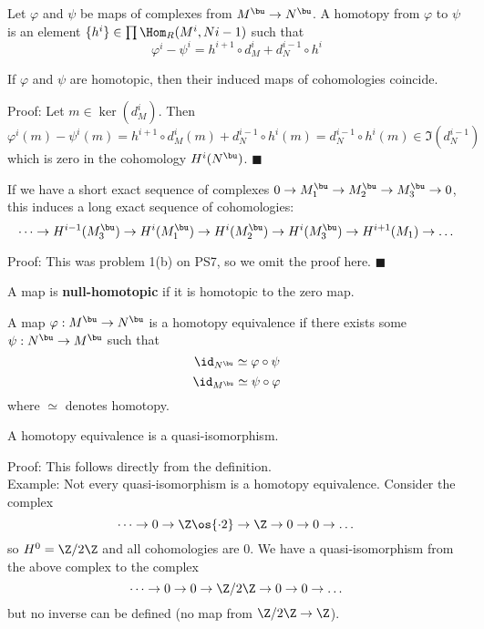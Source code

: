 \documentclass[10 pt]{article}
\newtheorem{cor}{Corollary}[section]
\newtheorem{lem}{Lemma}[section]
\newtheorem{prop}{Proposition}[section]
\newtheorem{propconstr}{Proposition-Construction}[section]
\newcommand\begin{lemma}{\begin{lem}}
\newcommand\begin{proposition}{\begin{prop}}
\newcommand\begin{proof}{\begin{proof}}
\newcommand\begin{corollary}{\begin{cor}}
\newcommand\begin{proposition}constr{\begin{propconstr}}
\newcommand\end{definition}{\end{defn}}
\newcommand\end{lemma}{\end{lem}}
\newcommand\end{corollary}{\end{cor}}
\newcommand\end{proposition}{\end{prop}}
\newcommand\end{proof}{\end{proof}}
\newcommand\end{proposition}constr{\end{propconstr}}
\begin{document}
\begin{definition} Let $\varphi$ and $\psi$ be maps of complexes from $M^\bu\rightarrow N^\bu$.  A homotopy from $\varphi$ to $\psi$ is an element $\{h^i\}\in \prod \Hom_R(M^i,N{i-1})$ such that
$$\varphi^i-\psi^i = h^{i+1}\circ d^i_M + d^{i-1}_N\circ h^i$$
\end{definition}

\begin{lemma} If $\varphi$ and $\psi$ are homotopic, then their induced maps of cohomologies coincide.\end{lemma}

Proof:  Let $m\in\ker(d^i_M)$.  Then
$$\varphi^i(m)-\psi^i(m)= h^{i+1}\circ d^i_M(m) + d^{i-1}_N\circ h^i(m)= d^{i-1}_N\circ h^i(m) \in \Im(d^{i-1}_N)$$
which is zero in the cohomology $H^i(N^\bu)$. $\blacksquare$

\begin{proposition} If we have a short exact sequence of complexes $0\rightarrow M_1^\bu\rightarrow M_2^\bu \rightarrow M_3^\bu\rightarrow 0$, this induces a long exact sequence of cohomologies:
$$\dots\rightarrow H^{i-1}(M_3^\bu)\rightarrow H^i(M_1^\bu)\rightarrow H^i(M_2^\bu)\rightarrow H^i(M_3^\bu) \rightarrow H^{i+1}(M_1)\rightarrow \dots$$
\end{proposition}

Proof:  This was problem 1(b) on PS7, so we omit the proof here. $\blacksquare$

\begin{definition} A map is {\bf null-homotopic} if it is homotopic to the zero map.\end{definition}

\begin{definition} A map $\varphi:M^\bu\rightarrow N^\bu$ is a homotopy equivalence if there exists some $\psi:N^\bu\rightarrow M^\bu$ such that
$$\id_{N^\bu}\simeq \varphi\circ \psi$$
$$\id_{M^\bu}\simeq \psi\circ \varphi$$
where $\simeq$ denotes homotopy.
\end{definition}

\begin{lemma} A homotopy equivalence is a quasi-isomorphism.\end{lemma}

Proof:  This follows directly from the definition.\\

Example:  Not every quasi-isomorphism is a homotopy equivalence.  Consider the complex
$$\dots \rightarrow 0\rightarrow\Z\os{\cdot 2}\rightarrow \Z\rightarrow 0\rightarrow 0\rightarrow\dots$$
so $H^0=\Z/2\Z$ and all cohomologies are 0.  We have a quasi-isomorphism from the above complex to the complex
$$\dots \rightarrow 0\rightarrow 0 \rightarrow \Z/2\Z\rightarrow 0\rightarrow 0\rightarrow\dots$$
but no inverse can be defined (no map from $\Z/2\Z\rightarrow \Z$).
\end{document}
